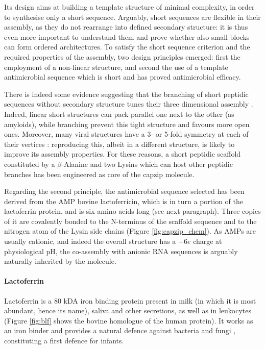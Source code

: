 Its design aims at building a template structure of minimal complexity, in order to synthesise only a short sequence. Arguably, short sequences are flexible in their assembly, as they do not rearrange into defined secondary structure: it is thus even more important to understand them and prove whether also small blocks can form ordered architectures.
%
To satisfy the short sequence criterion and the required properties of the assembly, two design principles emerged: first the employment of a non-linear structure, and second the use of a template antimicrobial sequence which is short and has proved antimicrobial efficacy.

There is indeed some evidence suggesting that the branching of short peptidic sequences without secondary structure tunes their three dimensional assembly \citep{Gudlur2012,Breger2017,Zhao2018branch}. Indeed, linear short structures can pack parallel one next to the other (as amyloids), while branching prevent this tight structure and favours more open ones.
%
Moreover, many viral structures have a 3- or 5-fold symmetry at each of their vertices \citep{Schoonen2014}: reproducing this, albeit in a different structure, is likely to improve its assembly properties.
%
For these reasons, a short peptidic scaffold constituted by a $\beta$-Alanine and two Lysins which can host other peptidic branches has been engineered as core of the capzip molecule.

Regarding the second principle, the antimicrobial sequence selected has been derived from the AMP bovine lactoferricin, which is in turn a portion of the lactoferrin protein, and is six amino acids long (see next paragraph).
%
Three copies of it are covalently bonded to the N-terminus of the scaffold sequence and to the nitrogen atom of the Lysin side chains (Figure \ref{fig:capzip_chem}).
%
As AMPs are usually cationic, and indeed the overall structure has a $+6e$ charge at physiological pH, the co-assembly with anionic RNA sequences is arguably naturally inherited by the molecule.


\paragraph{Lactoferrin} Lactoferrin is a 80 kDA iron binding protein present in milk (in which it is most abundant, hence its name), saliva and other secretions, as well as in leukocytes (Figure \ref{fig:blf} shows the bovine homologue of the human protein).
%
It works as an iron binder and provides a natural defence against bacteria and fungi \citep{Sanchez1992,Arnold1977,Arnold1980,Kirkpatrick1971,Jahani2015}, constituting a first defence for infants.

